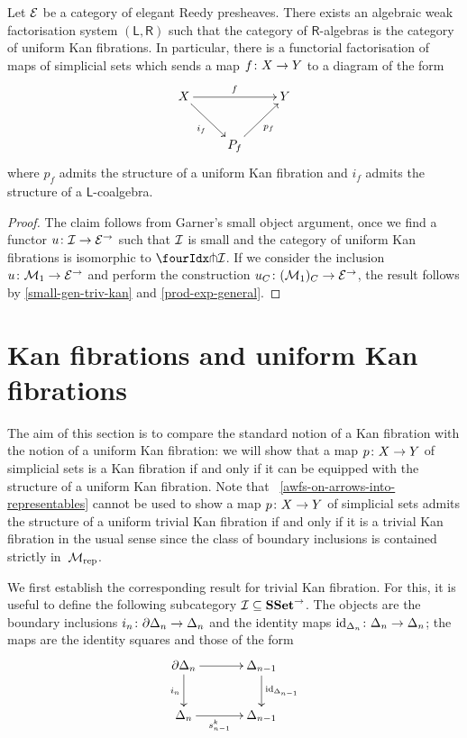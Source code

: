 \documentclass[reqno,10pt,a4paper,oneside,draft]{amsart}
\begin{document}
\begin{theorem}
Let $\catE$ be a category of elegant Reedy presheaves.
There exists an algebraic weak factorisation system $(\mathsf{L}, \mathsf{R})$ such that the category of $\mathsf{R}$-algebras is the category of uniform Kan fibrations.
In particular, there is a functorial factorisation of maps of simplicial sets which sends a map $f \co X \to Y$ to a diagram of the form
\[
\xymatrix{
X \ar[rr]^f \ar[dr]_{i_f} & & Y \\
 & P_f \ar[ur]_{p_f} }
 \]
where $p_f$ admits the structure of a uniform Kan fibration and $i_f$ admits the structure of a $\mathsf{L}$-coalgebra.
\end{theorem}

\begin{proof}
The claim follows from Garner's small object argument, once we find a functor $u \co \cal{I} \rightarrow \catE^\to$ such that $\cal{I}$ is small and the category of uniform Kan fibrations is isomorphic to $\liftr{\cal{I}}$.
If we consider the inclusion $u \co \cal{M}_1 \to \cal{E}^\to$ and perform the construction $u_\cyl \co (\cal{M}_1)_\cyl \to \catE^\to$, the result follows by \cref{small-gen-triv-kan} and \cref{prod-exp-general}.
\end{proof}


\section{Kan fibrations and uniform Kan fibrations}
\label{sec:kanfuk}

The aim of this section is to compare the standard notion of a Kan fibration with the notion of a uniform Kan fibration: we will show that a map $p \co X \to Y$ of simplicial sets is a Kan fibration if and only if it can be equipped with the structure of a uniform Kan fibration.
Note that ~\cref{awfs-on-arrows-into-representables} cannot be used to show a map $p \co X \to Y$ of simplicial sets admits the structure of a uniform trivial Kan fibration if and only if it is a trivial Kan fibration in the usual sense since the class of boundary inclusions is contained strictly in~$\cal{M}_{\mathrm{rep}}$.

We first establish the corresponding result for trivial Kan fibration.
For this, it is useful to define the following subcategory $\cal{I} \subseteq \SSet^\to$.
The objects are the boundary inclusions $i_n \co \partial \Delta_n \to \Delta_n$ and the identity maps $\id_{\Delta_n} \co \Delta_n \to \Delta_n$; the maps are the identity squares and those of the form
\[
\xymatrix@C=1.2cm{
  \partial \Delta_n
  \ar[r]
  \ar[d]_{i_n}
&
  \Delta_{n-1}
  \ar[d]^{\id_{\Delta_{n-1}}}
\\
  \Delta_n
  \ar[r]_-{s^k_{n-1}}
&
  \Delta_{n-1}
}
\]
\end{document}
